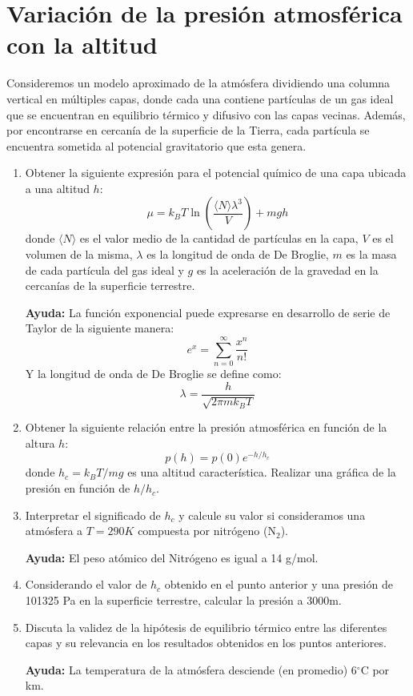 \documentclass[a4paper,11pt]{article}
\begin{document}
\section{Variación de la presión atmosférica con la altitud}

Consideremos un modelo aproximado de la atmósfera dividiendo una 
columna vertical en múltiples capas, donde cada una contiene partículas 
de un gas ideal que se encuentran en equilibrio térmico y difusivo con 
las capas vecinas. Además, por encontrarse en cercanía de la superficie 
de la Tierra, cada partícula se encuentra sometida al potencial 
gravitatorio que esta genera.


\begin{enumerate}[label=(\alph*),
                  leftmargin=2\parindent,
                  rightmargin=2\parindent]

    \item{Obtener la siguiente expresión para el potencial químico de 
          una capa ubicada a una altitud $h$:
          $$ \mu =
          k_B T \ln \left( \frac{\langle N \rangle \lambda^3}{V} \right)
          + mgh $$
          donde $\langle N \rangle$ es el valor medio de la cantidad de 
          partículas en la capa, $V$ es el volumen de la misma, 
          $\lambda$ es la longitud de onda de De Broglie, $m$ es la 
          masa de cada partícula del gas ideal y $g$ es la aceleración 
          de la gravedad en la cercanías de la superficie terrestre.
          }

    {\small
    \textbf{Ayuda:}
    La función exponencial puede expresarse en desarrollo de serie de 
    Taylor de la siguiente manera:
    $$ e^x = \sum_{n=0}^\infty \frac{x^n}{n!} $$
    Y la longitud de onda de De Broglie se define como:
    $$ \lambda = \frac{h}{\sqrt{2\pi m k_B T}} $$
    }

    \item{Obtener la siguiente relación entre la presión atmosférica 
          en función de la altura $h$:
          $$ p(h) = p(0) e^{-h/h_c} $$
          donde $h_c = k_B T / mg$ es una altitud característica.
          Realizar una gráfica de la presión en función de $h/h_c$.
          }
    
    \item{Interpretar el significado de $h_c$ y calcule su valor si 
          consideramos una atmósfera a $T = 290 K$ compuesta por 
          nitrógeno (N$_2$).}

    {\small
    \textbf{Ayuda:}
    El peso atómico del Nitrógeno es igual a 14 g/mol.
    }

    \item{Considerando el valor de $h_c$ obtenido en el punto anterior 
          y una presión de 101325 Pa en la superficie terrestre,
          calcular la presión a 3000m.}

    \item{Discuta la validez de la hipótesis de equilibrio térmico 
          entre las diferentes capas y su relevancia en los resultados 
          obtenidos en los puntos anteriores.}
    
    {\small
    \textbf{Ayuda:}
    La temperatura de la atmósfera desciende (en promedio) 6$^\circ$C 
    por km.
    }

\end{enumerate}
\end{document}
